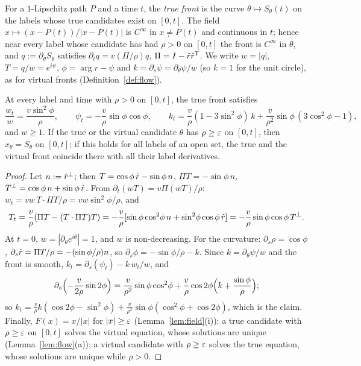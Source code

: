 For a $1$-Lipschitz path $P$ and a time $t$, the \emph{true front} is the curve $\theta\mapsto S_\theta(t)$ on the labels whose true
candidates exist on $[0,t]$. The field $x\mapsto(x-P(t))/|x-P(t)|$ is $C^\infty$ in $x\ne P(t)$ and continuous in $t$; hence near
every label whose candidate has had $\rho>0$ on $[0,t]$ the front is $C^\infty$ in $\theta$, and $q:=\partial_\theta S_\theta$
satisfies $\partial_tq=v(\Pi/\rho)q$, $\Pi=I-\hat r\hat r^{\mathsf T}$. We write $w=|q|$, $T=q/w=e^{i\psi}$, $\phi=\arg r-\psi$ and
$k=\partial_s\psi=\partial_\theta\psi/w$ (so $k=1$ for the unit circle), as for virtual fronts (Definition~\ref{def:flow}).

\begin{lemma}\label{lem:truefront}
At every label and time with $\rho>0$ on $[0,t]$, the true front satisfies
\[
\frac{w_t}w=\frac{v\sin^2\!\phi}\rho,\qquad\psi_t=-\frac v\rho\sin\phi\cos\phi,\qquad
k_t=\frac v\rho(1-3\sin^2\!\phi)\,k+\frac v{\rho^2}\sin\phi\,(3\cos^2\!\phi-1),
\]
and $w\ge1$. If the true or the virtual candidate $\theta$ has $\rho\ge\varepsilon$ on $[0,t]$, then $x_\theta=S_\theta$ on $[0,t]$; if this
holds for all labels of an open set, the true and the virtual front coincide there with all their label derivatives.
\end{lemma}
\begin{proof}
Let $n:=\hat r^\perp$; then $T=\cos\phi\,\hat r-\sin\phi\,n$, $\Pi T=-\sin\phi\,n$, $T^\perp=\cos\phi\,n+\sin\phi\,\hat r$. From
$\partial_t(wT)=v\Pi(wT)/\rho$: $w_t=vw\,T\cdot\Pi T/\rho=vw\sin^2\!\phi/\rho$, and
\[
T_t=\frac v\rho(\Pi T-(T\cdot\Pi T)T)=-\frac v\rho[\sin\phi\cos^2\!\phi\,n+\sin^2\!\phi\cos\phi\,\hat r]=-\frac v\rho\sin\phi\cos\phi\,T^\perp .
\]
At $t=0$, $w=|\partial_\theta e^{i\theta}|=1$, and $w$ is non-decreasing. For the curvature: $\partial_s\rho=\cos\phi$,
$\partial_s\hat r=\Pi T/\rho=-(\sin\phi/\rho)n$, so $\partial_s\phi=-\sin\phi/\rho-k$. Since $k=\partial_\theta\psi/w$ and the front is
smooth, $k_t=\partial_s(\psi_t)-k\,w_t/w$, and
\[
\partial_s\Bigl(-\frac v{2\rho}\sin2\phi\Bigr)=\frac v{\rho^2}\sin\phi\cos^2\!\phi+\frac v\rho\cos2\phi\Bigl(k+\frac{\sin\phi}\rho\Bigr);
\]
so $k_t=\frac v\rho k(\cos2\phi-\sin^2\!\phi)+\frac v{\rho^2}\sin\phi(\cos^2\!\phi+\cos2\phi)$, which is the claim. Finally, $F(x)=x/|x|$
for $|x|\ge\varepsilon$ (Lemma~\ref{lem:field}(i)): a true candidate with $\rho\ge\varepsilon$ on $[0,t]$ solves the virtual equation, whose
solutions are unique (Lemma~\ref{lem:flow}(a)); a virtual candidate with $\rho\ge\varepsilon$ solves the true equation, whose solutions are
unique while $\rho>0$.
\end{proof}

